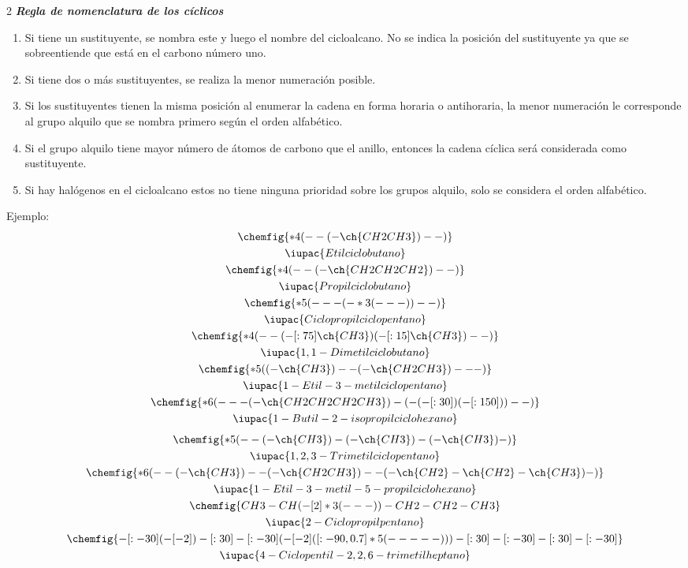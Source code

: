 \begin{multicols} {2}
\noindent \textit{\textbf{Regla de nomenclatura de los cíclicos}}
\begin{enumerate}
	\item Si tiene un sustituyente, se nombra este y luego el nombre del cicloalcano. No se indica la posición del sustituyente ya que se sobreentiende que está en el carbono número uno.
	\item Si tiene dos o más sustituyentes, se realiza la menor numeración posible.
	\item Si los sustituyentes tienen la misma posición al enumerar la cadena en forma horaria o antihoraria, la menor numeración le corresponde al grupo alquilo que se nombra primero según el orden alfabético.
	\item Si el grupo alquilo tiene mayor número de átomos de carbono que el anillo, entonces la cadena cíclica será considerada como sustituyente.
	\item Si hay halógenos en el cicloalcano estos no tiene ninguna prioridad sobre los grupos alquilo, solo se considera el orden alfabético.
\end{enumerate}
\noindent Ejemplo: \\
\begin{gather*}
	\chemfig{*4(--(-\ch{CH2CH3})--)} \\
	\iupac{Etilciclobutano} \\
	\chemfig{*4(--(-\ch{CH2CH2CH2})--)} \\
	\iupac{Propilciclobutano} \\
	\chemfig{*5(---(-*3(---))--)} \\
	\iupac{Ciclopropilciclopentano} \\
	\chemfig{*4(--(-[:75]\ch{CH3})(-[:15]\ch{CH3})--)} \\
	\iupac{1,1-Dimetilciclobutano} \\
	\chemfig{*5((-\ch{CH3})--(-\ch{CH2CH3})---)} \\
	\iupac{1-Etil-3-metilciclopentano} \\
	\chemfig{*6(---(-\ch{CH2CH2CH2CH3})-(-(-[:30])(-[:150]))--)} \\
	\iupac{1-Butil-2-isopropilciclohexano} \\
\end{gather*}
\begin{gather*}
	\chemfig{*5(--(-\ch{CH3})-(-\ch{CH3})-(-\ch{CH3})-)} \\
	\iupac{1,2,3-Trimetilciclopentano} \\
	\chemfig{*6(--(-\ch{CH3})--(-\ch{CH2CH3})--(-\ch{CH2}-\ch{CH2}-\ch{CH3})-)} \\
	\iupac{1-Etil-3-metil-5-propilciclohexano} \\
	\chemfig{CH3-CH(-[2]*3(---))-CH2-CH2-CH3} \\
	\iupac{2-Ciclopropilpentano} \\
	\chemfig{-[:-30](-[-2])-[:30]-[:-30](-[-2]([:-90,0.7]*5(-----)))-[:30]-[:-30]-[:30]-[:-30]} \\
	\iupac{4-Ciclopentil-2,2,6-trimetilheptano}
\end{gather*}

\end{multicols}
